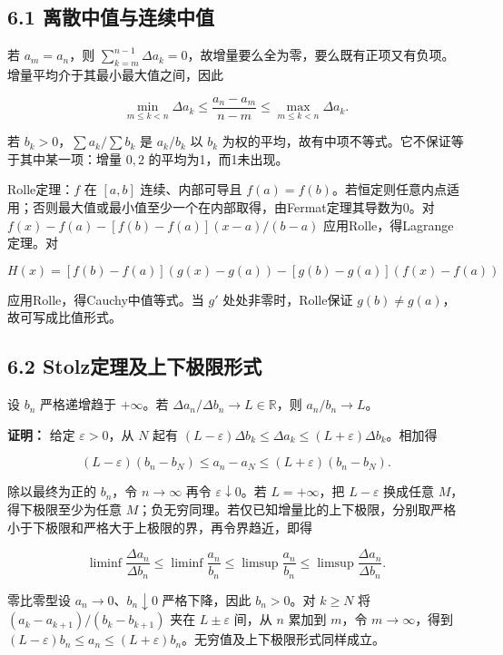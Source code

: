 \documentclass[11pt,a4paper]{article}
\begin{document}
\subsection{6.1
离散中值与连续中值}\label{ux79bbux6563ux4e2dux503cux4e0eux8fdeux7eedux4e2dux503c}

若 \(a_m=a_n\)，则
\(\sum_{k=m}^{n-1}\Delta a_k=0\)，故增量要么全为零，要么既有正项又有负项。增量平均介于其最小最大值之间，因此

\[
\min_{m\le k<n}\Delta a_k\le\frac{a_n-a_m}{n-m}\le\max_{m\le k<n}\Delta a_k.
\]

若 \(b_k>0\)，\(\sum a_k/\sum b_k\) 是 \(a_k/b_k\) 以 \(b_k\)
为权的平均，故有中项不等式。它不保证等于其中某一项：增量 \(0,2\)
的平均为1，而1未出现。

Rolle定理：\(f\) 在 \([a,b]\) 连续、内部可导且
\(f(a)=f(b)\)。若恒定则任意内点适用；否则最大值或最小值至少一个在内部取得，由Fermat定理其导数为0。对
\(f(x)-f(a)-[f(b)-f(a)](x-a)/(b-a)\) 应用Rolle，得Lagrange定理。对

\[
H(x)=[f(b)-f(a)](g(x)-g(a))-[g(b)-g(a)](f(x)-f(a))
\]

应用Rolle，得Cauchy中值等式。当 \(g'\) 处处非零时，Rolle保证
\(g(b)\ne g(a)\)，故可写成比值形式。

\subsection{6.2
Stolz定理及上下极限形式}\label{stolzux5b9aux7406ux53caux4e0aux4e0bux6781ux9650ux5f62ux5f0f}

设 \(b_n\) 严格递增趋于 \(+\infty\)。若
\(\Delta a_n/\Delta b_n\to L\in\mathbb R\)，则 \(a_n/b_n\to L\)。

\textbf{证明：} 给定 \(\varepsilon>0\)，从 \(N\) 起有
\((L-\varepsilon)\Delta b_k\le\Delta a_k\le(L+\varepsilon)\Delta b_k\)。相加得

\[
(L-\varepsilon)(b_n-b_N)\le a_n-a_N
\le(L+\varepsilon)(b_n-b_N).
\]

除以最终为正的 \(b_n\)，令 \(n\to\infty\) 再令
\(\varepsilon\downarrow0\)。若 \(L=+\infty\)，把 \(L-\varepsilon\)
换成任意 \(M\)，得下极限至少为任意
\(M\)；负无穷同理。若仅已知增量比的上下极限，分别取严格小于下极限和严格大于上极限的界，再令界趋近，即得

\[
\liminf\frac{\Delta a_n}{\Delta b_n}
\le\liminf\frac{a_n}{b_n}
\le\limsup\frac{a_n}{b_n}
\le\limsup\frac{\Delta a_n}{\Delta b_n}.\tag{6.1}
\]

零比零型设 \(a_n\to0\)、\(b_n\downarrow0\) 严格下降，因此 \(b_n>0\)。对
\(k\ge N\) 将 \((a_k-a_{k+1})/(b_k-b_{k+1})\) 夹在 \(L\pm\varepsilon\)
间，从 \(n\) 累加到 \(m\)，令 \(m\to\infty\)，得到
\((L-\varepsilon)b_n\le a_n\le(L+\varepsilon)b_n\)。无穷值及上下极限形式同样成立。
\end{document}

